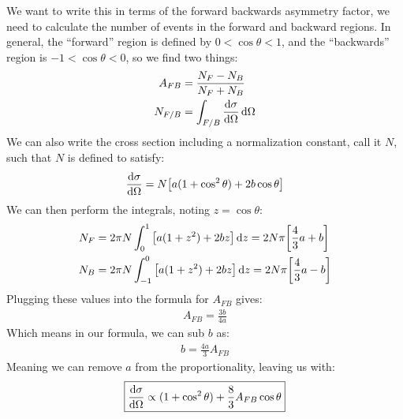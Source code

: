 \documentclass[12pt]{article}
\begin{document}
We want to write this in terms of the forward backwards asymmetry factor, we need to calculate the number of events in the forward and backward regions. In general, the ``forward'' region is defined by $0<\cos\theta<1$, and the ``backwards'' region is $-1<\cos\theta<0$, so we find two things:
\begin{align*}
  A_{FB}&=\frac{N_F-N_B}{N_F+N_B}\\
  N_{F/B}&=\int_{F/B}\dv{\sigma}{\Omega}\dd{\Omega}
\end{align*}
We can also write the cross section including a normalization constant, call it $N$, such that $N$ is defined to satisfy:
\begin{align*}
  \dv{\sigma}{\Omega}=N\qty[a(1+\cos^2\theta)+2b\cos\theta]
\end{align*}
We can then perform the integrals, noting $z=\cos\theta$:
\begin{align*}
  N_F&=2\pi N\int_0^1\qty[a(1+z^2)+2bz]\dd{z}=2N\pi\qty[\frac43a+b]\\
  N_B&=2\pi N\int_{-1}^0\qty[a(1+z^2)+2bz]\dd{z}=2N\pi\qty[\frac43a-b]
\end{align*}
Plugging these values into the formula for $A_{FB}$ gives:
\begin{align*}
  A_{FB}=\frac{3b}{4a}
\end{align*}
Which means in our formula, we can sub $b$ as:
\begin{align*}
  b=\frac{4a}{3}A_{FB}
\end{align*}
Meaning we can remove $a$ from the proportionality, leaving us with:
\begin{equation}
  \label{eq:p4}
  \boxed{\dv{\sigma}{\Omega}\propto(1+\cos^2\theta)+\frac83A_{FB}\cos\theta}
\end{equation}

\newpage
\end{document}
